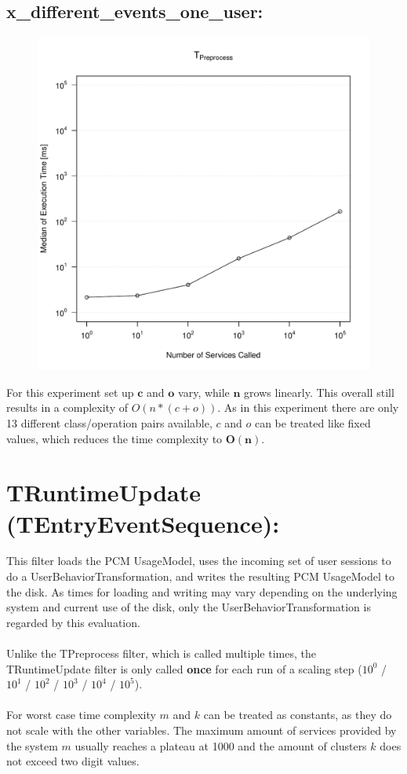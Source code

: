 \documentclass[10pt,a4paper]{article}
\begin{document}
	\subsection{x\_different\_events\_one\_user:}
	\begin{figure}[H]
		\centering
		\includegraphics[scale=0.7]{graphics/TPreprocess_median_different_events.pdf}
	\end{figure}
	For this experiment set up $\mathbf{c}$ and $\mathbf{o}$ vary, while $\mathbf{n}$ grows linearly. This overall still results in a complexity of $O(n * (c + o))$. As in this experiment there are only 13 different class/operation pairs available, $c$ and $o$ can be treated like fixed values, which reduces the time complexity to $\mathbf{O(n)}$.
	\newpage
	\section{TRuntimeUpdate (TEntryEventSequence):}
	This filter loads the PCM UsageModel, uses the incoming set of user sessions to do a UserBehaviorTransformation, and writes the resulting PCM UsageModel to the disk. As times for loading and writing may vary depending on the underlying system and current use of the disk, only the UserBehaviorTransformation is regarded by this evaluation.\\
	\\
	Unlike the TPreprocess filter, which is called multiple times, the TRuntimeUpdate filter is only called \textbf{once} for each run of a scaling step ($10^0$ / $10^1$ / $10^2$ / $10^3$ / $10^4$ / $10^5$).\\
	\\
	For worst case time complexity $m$ and $k$ can be treated as constants, as they do not scale with the other variables. The maximum amount of services provided by the system $m$ usually reaches a plateau at 1000 and the amount of clusters $k$ does not exceed two digit values.
\end{document}
